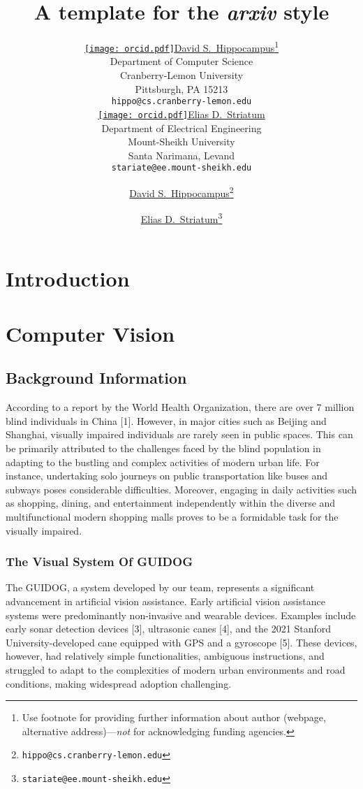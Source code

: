 \documentclass{article}
\title{A template for the \emph{arxiv} style}
\author{ \href{https://orcid.org/0000-0000-0000-0000}{\texttt{[image: orcid.pdf]}\hspace{1mm}David S.~Hippocampus}\thanks{Use footnote for providing further
		information about author (webpage, alternative
		address)---\emph{not} for acknowledging funding agencies.} \\
	Department of Computer Science\\
	Cranberry-Lemon University\\
	Pittsburgh, PA 15213 \\
	\texttt{hippo@cs.cranberry-lemon.edu} \\
	\And
	\href{https://orcid.org/0000-0000-0000-0000}{\texttt{[image: orcid.pdf]}\hspace{1mm}Elias D.~Striatum} \\
	Department of Electrical Engineering\\
	Mount-Sheikh University\\
	Santa Narimana, Levand \\
	\texttt{stariate@ee.mount-sheikh.edu} \\
}
\author[1]{%
	\href{https://orcid.org/0000-0000-0000-0000}{\usebox{\orcid}\hspace{1mm}David S.~Hippocampus\thanks{\texttt{hippo@cs.cranberry-lemon.edu}}}%
}
\author[1,2]{%
	\href{https://orcid.org/0000-0000-0000-0000}{\usebox{\orcid}\hspace{1mm}Elias D.~Striatum\thanks{\texttt{stariate@ee.mount-sheikh.edu}}}%
}
\affil[1]{Department of Computer Science, Cranberry-Lemon University, Pittsburgh, PA 15213}
\affil[2]{Department of Electrical Engineering, Mount-Sheikh University, Santa Narimana, Levand}
\begin{document}
\maketitle

\begin{abstract}
	\lipsum[1]
\end{abstract}




\section{Introduction}
\lipsum[2]
\lipsum[3]

\section{Computer Vision}
\label{sec:headings}


\subsection{Background Information}
According to a report by the World Health Organization, there are over 7 million blind individuals in China [1]. However, in major cities such as Beijing and Shanghai, visually impaired individuals are rarely seen in public spaces. This can be primarily attributed to the challenges faced by the blind population in adapting to the bustling and complex activities of modern urban life. For instance, undertaking solo journeys on public transportation like buses and subways poses considerable difficulties. Moreover, engaging in daily activities such as shopping, dining, and entertainment independently within the diverse and multifunctional modern shopping malls proves to be a formidable task for the visually impaired.

\subsubsection{The Visual System Of GUIDOG }
The GUIDOG, a system developed by our team, represents a significant advancement in artificial vision assistance. Early artificial vision assistance systems were predominantly non-invasive and wearable devices. Examples include early sonar detection devices [3], ultrasonic canes [4], and the 2021 Stanford University-developed cane equipped with GPS and a gyroscope [5]. These devices, however, had relatively simple functionalities, ambiguous instructions, and struggled to adapt to the complexities of modern urban environments and road conditions, making widespread adoption challenging.
\end{document}
